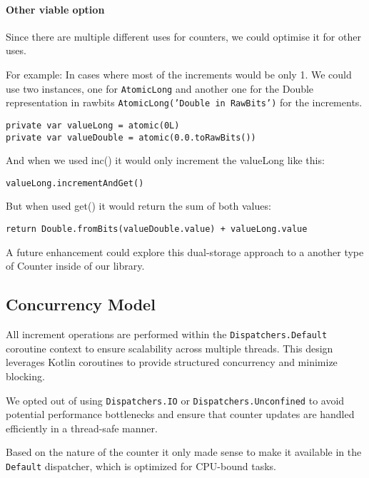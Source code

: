 
\paragraph{Other viable option}
Since there are multiple different uses for counters, we could optimise it for other uses.

For example:
In cases where most of the increments would be only 1.
We could use two instances, one for \texttt{AtomicLong} and another one for the Double representation in rawbits \texttt{AtomicLong('Double in RawBits')} for the increments.


\begin{verbatim}
private var valueLong = atomic(0L)
private var valueDouble = atomic(0.0.toRawBits())
\end{verbatim}

And when we used inc() it would only increment the valueLong like this:
\begin{verbatim}
valueLong.incrementAndGet()
\end{verbatim}


But when used get() it would return the sum of both values:
\begin{verbatim}
return Double.fromBits(valueDouble.value) + valueLong.value
\end{verbatim}

A future enhancement could explore this dual-storage approach to a another type of Counter inside of our library.



\subsection{Concurrency Model}
All increment operations are performed within the \texttt{Dispatchers.Default} coroutine context to ensure scalability across multiple threads. This design leverages Kotlin coroutines to provide structured concurrency and minimize blocking.

We opted out of using \texttt{Dispatchers.IO} or \texttt{Dispatchers.Unconfined} to avoid potential performance bottlenecks and ensure that counter updates are handled efficiently in a thread-safe manner.

Based on the nature of the counter it only made sense to make it available in the \texttt{Default} dispatcher, which is optimized for CPU-bound tasks. 

